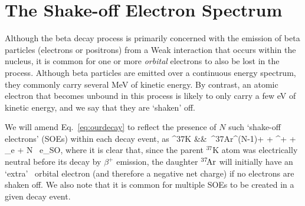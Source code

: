 





\section{The Shake-off Electron Spectrum}
\label{section:soe_intro}
Although the beta decay process is primarily concerned with the emission of beta particles (electrons or positrons) from a Weak interaction that occurs within the nucleus, it is common for one or more \emph{orbital} electrons to also be lost in the process.  Although beta particles are emitted over a continuous energy spectrum, they commonly carry several MeV of kinetic energy.  By contrast, an atomic electron that becomes unbound in this process is likely to only carry a few eV of kinetic energy, and we say that they are `shaken' off.  

We will amend Eq.~\ref{eq:ourdecay} to reflect the presence of $N$ such `shake-off electrons' (SOEs) within each decay event, as
\bea
^{37}\textrm{K} &\rightarrow& \,^{37}\textrm{\!Ar}^{(N-1)+} + \beta^{+} + \nu_e + N \, e_{\textrm{SO}}, 
\label{eq:ourdecay_withsoe}
\eea
where it is clear that, since the parent $^{37}\textrm{K}$ atom was electrically neutral before its decay by $\beta^+$ emission, the daughter $^{37}\textrm{\!Ar}$ will initially have an `extra'~ orbital electron (and therefore a negative net charge) if no electrons are shaken off.  We also note that it is common for multiple SOEs to be created in a given decay event.  

